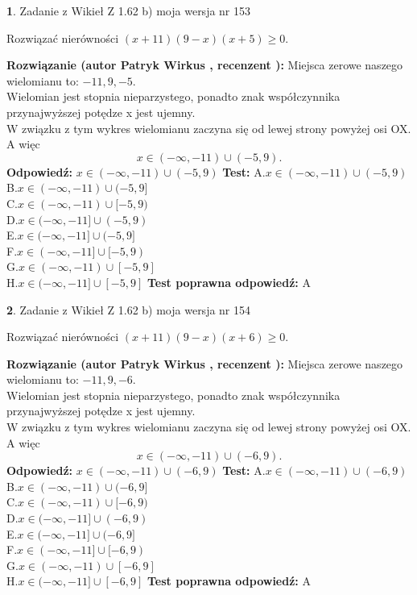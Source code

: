 \documentclass[12pt, a4paper]{article}
\theoremstyle{definition} %
\newtheorem{zad}{}
\newcommand{\zadStart}[1]{\begin{zad}#1\newline}
\newcommand{\zadStop}{\end{zad}}
\newcommand{\rozwStart}[2]{\noindent \textbf{Rozwiązanie (autor #1 , recenzent #2): }\newline}
\newcommand{\rozwStop}{\newline}
\newcommand{\odpStart}{\noindent \textbf{Odpowiedź:}\newline}
\newcommand{\odpStop}{\newline}
\newcommand{\testStart}{\noindent \textbf{Test:}\newline}
\newcommand{\testStop}{\newline}
\newcommand{\kluczStart}{\noindent \textbf{Test poprawna odpowiedź:}\newline}
\newcommand{\kluczStop}{\newline}
\begin{document}
\zadStart{Zadanie z Wikieł Z 1.62 b) moja wersja nr 153}

Rozwiązać nierówności $(x+11)(9-x)(x+5)\ge0$.
\zadStop
\rozwStart{Patryk Wirkus}{}
Miejsca zerowe naszego wielomianu to: $-11, 9, -5$.\\
Wielomian jest stopnia nieparzystego, ponadto znak współczynnika przy\linebreak najwyższej potędze x jest ujemny.\\ W związku z tym wykres wielomianu zaczyna się od lewej strony powyżej osi OX. A więc $$x \in (-\infty,-11) \cup (-5,9).$$
\rozwStop
\odpStart
$x \in (-\infty,-11) \cup (-5,9)$
\odpStop
\testStart
A.$x \in (-\infty,-11) \cup (-5,9)$\\
B.$x \in (-\infty,-11) \cup (-5,9]$\\
C.$x \in (-\infty,-11) \cup [-5,9)$\\
D.$x \in (-\infty,-11] \cup (-5,9)$\\
E.$x \in (-\infty,-11] \cup (-5,9]$\\
F.$x \in (-\infty,-11] \cup [-5,9)$\\
G.$x \in (-\infty,-11) \cup [-5,9]$\\
H.$x \in (-\infty,-11] \cup [-5,9]$
\testStop
\kluczStart
A
\kluczStop



\zadStart{Zadanie z Wikieł Z 1.62 b) moja wersja nr 154}

Rozwiązać nierówności $(x+11)(9-x)(x+6)\ge0$.
\zadStop
\rozwStart{Patryk Wirkus}{}
Miejsca zerowe naszego wielomianu to: $-11, 9, -6$.\\
Wielomian jest stopnia nieparzystego, ponadto znak współczynnika przy\linebreak najwyższej potędze x jest ujemny.\\ W związku z tym wykres wielomianu zaczyna się od lewej strony powyżej osi OX. A więc $$x \in (-\infty,-11) \cup (-6,9).$$
\rozwStop
\odpStart
$x \in (-\infty,-11) \cup (-6,9)$
\odpStop
\testStart
A.$x \in (-\infty,-11) \cup (-6,9)$\\
B.$x \in (-\infty,-11) \cup (-6,9]$\\
C.$x \in (-\infty,-11) \cup [-6,9)$\\
D.$x \in (-\infty,-11] \cup (-6,9)$\\
E.$x \in (-\infty,-11] \cup (-6,9]$\\
F.$x \in (-\infty,-11] \cup [-6,9)$\\
G.$x \in (-\infty,-11) \cup [-6,9]$\\
H.$x \in (-\infty,-11] \cup [-6,9]$
\testStop
\kluczStart
A
\kluczStop
\end{document}
